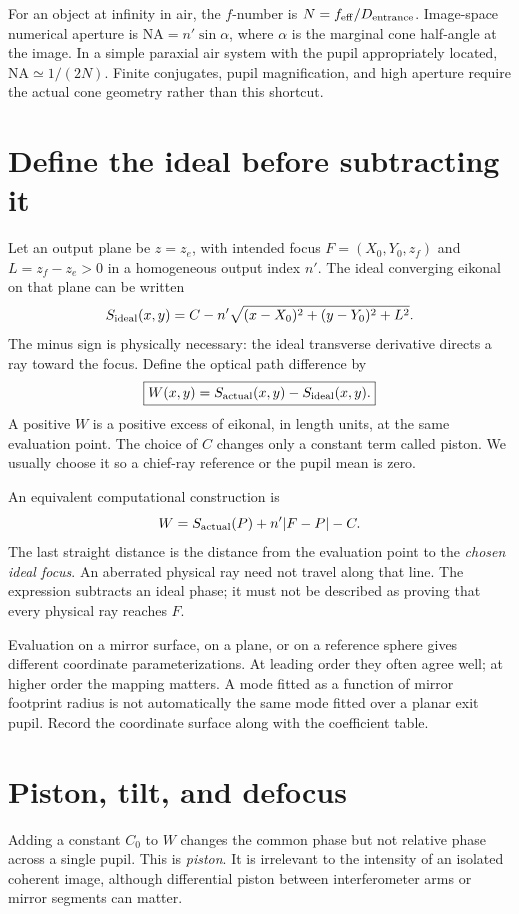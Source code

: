 For an object at infinity in air, the $f$-number is $N=f_{\rm eff}/D_{\rm entrance}$. Image-space numerical aperture is $\mathrm{NA}=n'\sin\alpha$, where $\alpha$ is the marginal cone half-angle at the image. In a simple paraxial air system with the pupil appropriately located, $\mathrm{NA}\simeq1/(2N)$. Finite conjugates, pupil magnification, and high aperture require the actual cone geometry rather than this shortcut.

\section{Define the ideal before subtracting it}
Let an output plane be $z=z_e$, with intended focus $F=(X_0,Y_0,z_f)$ and $L=z_f-z_e>0$ in a homogeneous output index $n'$. The ideal converging eikonal on that plane can be written
\begin{equation}
S_{\rm ideal}(x,y)=C-n'\sqrt{(x-X_0)^2+(y-Y_0)^2+L^2}.
\label{fnd:ideal-eikonal}
\end{equation}
The minus sign is physically necessary: the ideal transverse derivative directs a ray toward the focus. Define the optical path difference by
\begin{equation}
\boxed{W(x,y)=S_{\rm actual}(x,y)-S_{\rm ideal}(x,y).}
\label{fnd:w-sign}
\end{equation}
A positive $W$ is a positive excess of eikonal, in length units, at the same evaluation point. The choice of $C$ changes only a constant term called piston. We usually choose it so a chief-ray reference or the pupil mean is zero.

An equivalent computational construction is
\[
W=S_{\rm actual}(P)+n'|F-P|-C.
\]
The last straight distance is the distance from the evaluation point to the \emph{chosen ideal focus}. An aberrated physical ray need not travel along that line. The expression subtracts an ideal phase; it must not be described as proving that every physical ray reaches $F$.

Evaluation on a mirror surface, on a plane, or on a reference sphere gives different coordinate parameterizations. At leading order they often agree well; at higher order the mapping matters. A mode fitted as a function of mirror footprint radius is not automatically the same mode fitted over a planar exit pupil. Record the coordinate surface along with the coefficient table.

\section{Piston, tilt, and defocus}
Adding a constant $C_0$ to $W$ changes the common phase but not relative phase across a single pupil. This is \emph{piston}. It is irrelevant to the intensity of an isolated coherent image, although differential piston between interferometer arms or mirror segments can matter.

